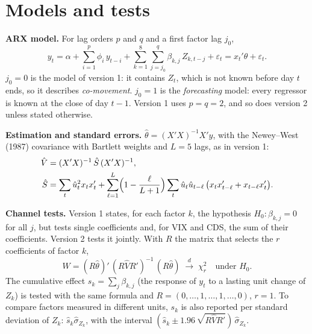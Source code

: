 \documentclass[11pt,a4paper]{article}
\begin{document}
\section{Models and tests}

\textbf{ARX model.} For lag orders $p$ and $q$ and a first factor lag $j_0$,
\begin{equation}
  y_t = \alpha + \sum_{i=1}^{p} \phi_i\, y_{t-i} + \sum_{k=1}^{8} \sum_{j=j_0}^{q} \beta_{k,j}\, Z_{k,t-j} + \varepsilon_t
      = x_t'\theta + \varepsilon_t .
  \label{eq:arx}
\end{equation}
$j_0 = 0$ is the model of version 1: it contains $Z_t$, which is not known before day $t$ ends, so it describes
\emph{co-movement}. $j_0 = 1$ is the \emph{forecasting} model: every regressor is known at the close of day $t-1$. Version 1 uses
$p = q = 2$, and so does version 2 unless stated otherwise.

\textbf{Estimation and standard errors.} $\hat\theta = (X'X)^{-1}X'y$, with the Newey--West (1987) covariance with Bartlett
weights and $L = 5$ lags, as in version 1:
\begin{equation}
\begin{aligned}
  \hat V &= (X'X)^{-1}\, \hat S\, (X'X)^{-1},\\
  \hat S &= \sum_t \hat u_t^2 x_t x_t' + \sum_{\ell=1}^{L} \Bigl(1 - \frac{\ell}{L+1}\Bigr)
           \sum_{t} \hat u_t \hat u_{t-\ell}\, \bigl(x_t x_{t-\ell}' + x_{t-\ell} x_t'\bigr).
\end{aligned}
\end{equation}

\textbf{Channel tests.} Version 1 states, for each factor $k$, the hypothesis $H_0: \beta_{k,j} = 0$ for all $j$, but tests
single coefficients and, for VIX and CDS, the sum of their coefficients. Version 2 tests it jointly. With $R$ the matrix that selects the $r$ coefficients of factor $k$,
\begin{equation}
  W = (R\hat\theta)'\,(R\hat V R')^{-1}\,(R\hat\theta) \;\xrightarrow{d}\; \chi^2_r \quad \text{under } H_0 .
\end{equation}
The cumulative effect $s_k = \sum_j \beta_{k,j}$ (the response of $y_t$ to a lasting unit change of $Z_k$) is tested with the
same formula and $R = (0, \dots, 1, \dots, 1, \dots, 0)$, $r = 1$. To compare factors measured in different units, $s_k$ is also
reported per standard deviation of $Z_k$: $\hat s_k \hat\sigma_{Z_k}$, with the interval
$(\hat s_k \pm 1.96\,\sqrt{R\hat V R'})\,\hat\sigma_{Z_k}$.
\end{document}
